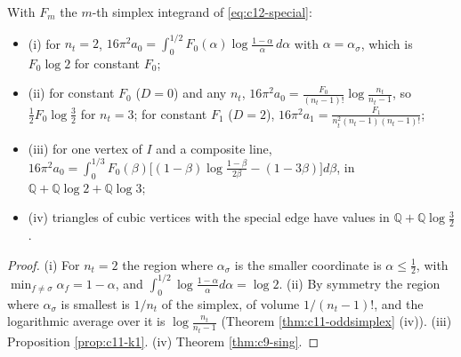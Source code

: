 \begin{proposition}
\label{prop:c12-closed}
With $F_m$ the $m$-th simplex integrand of \eqref{eq:c12-special}:
\begin{itemize}
\item (i) for $n_t=2$, $16\pi^2a_0=\int_0^{1/2}F_0(\alpha)\log\frac{1-\alpha}\alpha\,d\alpha$ with $\alpha=\alpha_\sigma$, which is $F_0\log2$ for constant $F_0$;
\item (ii) for constant $F_0$ ($D=0$) and any $n_t$, $16\pi^2a_0=\frac{F_0}{(n_t-1)!}\log\frac{n_t}{n_t-1}$, so $\tfrac12F_0\log\tfrac32$ for $n_t=3$; for constant $F_1$ ($D=2$), $16\pi^2a_1=\frac{F_1}{n_t^2(n_t-1)(n_t-1)!}$;
\item (iii) for one vertex of $I$ and a composite line, $16\pi^2a_0=\int_0^{1/3}F_0(\beta)\big[(1-\beta)\log\frac{1-\beta}{2\beta}-(1-3\beta)\big]d\beta$, in $\mathbb Q+\mathbb Q\log2+\mathbb Q\log3$;
\item (iv) triangles of cubic vertices with the special edge have values in $\mathbb Q+\mathbb Q\log\tfrac32$.
\end{itemize}
\end{proposition}

\begin{proof}
(i) For $n_t=2$ the region where $\alpha_\sigma$ is the smaller coordinate is $\alpha\le\tfrac12$, with $\min_{f\neq\sigma}\alpha_f=1-\alpha$, and $\int_0^{1/2}\log\frac{1-\alpha}\alpha d\alpha=\log2$. (ii) By symmetry the region where $\alpha_\sigma$ is smallest is $1/n_t$ of the simplex, of volume $1/(n_t-1)!$, and the logarithmic average over it is $\log\frac{n_t}{n_t-1}$ (Theorem \ref{thm:c11-oddsimplex} (iv)). (iii) Proposition \ref{prop:c11-k1}. (iv) Theorem \ref{thm:c9-sing}.
\end{proof}

